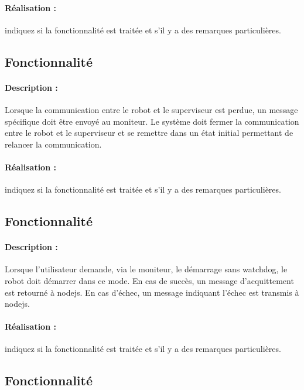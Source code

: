 \documentclass[11pt, a4paper]{paper}
\newcounter{cptreq}
\begin{document}
\paragraph{\color{black}Réalisation :}  {\color{red} indiquez si la fonctionnalité est traitée et s'il y a des remarques particulières.}

\subsection{Fonctionnalité \thecptreq}

\paragraph{Description :} Lorsque la communication entre le robot et le superviseur est perdue, un message spécifique doit être envoyé au moniteur. Le système doit fermer la communication entre le robot et le superviseur et se remettre dans un état initial permettant de relancer la communication.

\paragraph{\color{black}Réalisation :}  {\color{red} indiquez si la fonctionnalité est traitée et s'il y a des remarques particulières.}

{\color{gray}
\subsection{Fonctionnalité \thecptreq *}

\paragraph{Description :} Lorsque l'utilisateur demande, via le moniteur, le démarrage sans watchdog, le robot doit démarrer dans ce mode. En cas de succès, un message d'acquittement est retourné à nodejs. En cas d'échec, un message indiquant l'échec est transmis à nodejs.

\paragraph{\color{black}Réalisation :}  {\color{red} indiquez si la fonctionnalité est traitée et s'il y a des remarques particulières.}
}
\subsection{Fonctionnalité \thecptreq}
\end{document}

